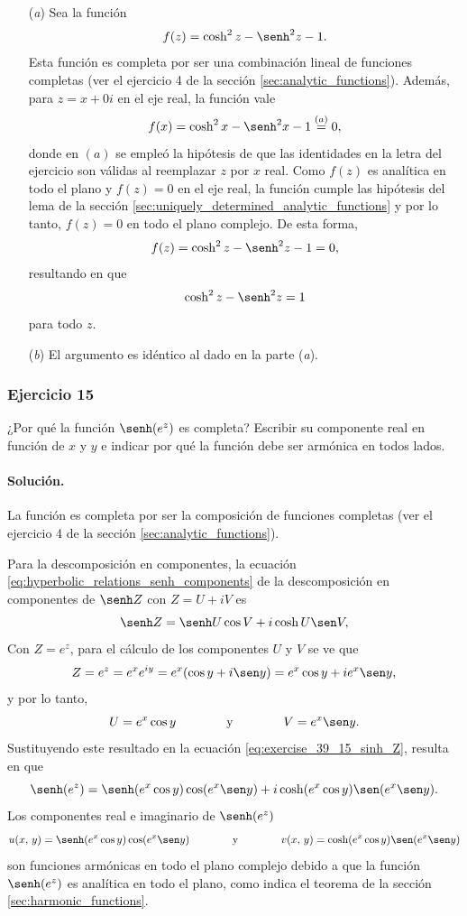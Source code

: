 \documentclass[a4paper]{report}
\begin{document}
\begin{enumerate}
 \item[(\textit{a})] Sea la función 
 \[
  f(z)=\cosh^2z-\senh^2z-1.
 \]
 Esta función es completa por ser una combinación lineal de funciones completas (ver el ejercicio 4 de la sección \ref{sec:analytic_functions}). Además, para \(z=x+0i\) en el eje real, la función vale
 \[
  f(x)=\cosh^2x-\senh^2x-1\overset{(a)}{=}0,
 \]
 donde en \((a)\) se empleó la hipótesis de que las identidades en la letra del ejercicio son válidas al reemplazar \(z\) por \(x\) real. Como \(f(z)\) es analítica en todo el plano y \(f(z)=0\) en el eje real, la función cumple las hipótesis del lema de la sección \ref{sec:uniquely_determined_analytic_functions} y por lo tanto, \(f(z)=0\) en todo el plano complejo. De esta forma,
 \[
  f(z)=\cosh^2z-\senh^2z-1=0,
 \]
 resultando en que 
 \[
  \cosh^2z-\senh^2z=1
 \]
 para todo \(z\).
 \item[(\textit{b})] El argumento es idéntico al dado en la parte (\textit{a}).
\end{enumerate}

\subsubsection{Ejercicio 15}

¿Por qué la función \(\senh(e^z)\) es completa? Escribir su componente real en función de \(x\) y \(y\) e indicar por qué la función debe ser armónica en todos lados.

\paragraph{Solución.} La función es completa por ser la composición de funciones completas (ver el ejercicio 4 de la sección \ref{sec:analytic_functions}).

Para la descomposición en componentes, la ecuación \ref{eq:hyperbolic_relations_senh_components} de la descomposición en componentes de \(\senh Z\) con \(Z=U+iV\) es
\begin{equation}\label{eq:exercise_39_15_sinh_Z}
 \senh Z=\senh U\cos V+i\cosh U\sen V,
\end{equation}
Con \(Z=e^z\), para el cálculo de los componentes \(U\) y \(V\) se ve que 
\[
 Z=e^z=e^xe^{iy}=e^x(\cos y+i\sen y)=e^x\cos y+ie^x\sen y,
\]
y por lo tanto,
\[
 U=e^x\cos y
 \qquad\qquad\textrm{y}\qquad\qquad
 V=e^x\sen y.
\]
Sustituyendo este resultado en la ecuación \ref{eq:exercise_39_15_sinh_Z}, resulta en que 
\[
 \senh(e^z)=\senh(e^x\cos y)\cos(e^x\sen y)+i\cosh(e^x\cos y)\sen(e^x\sen y).
\]
Los componentes real e imaginario de \(\senh(e^z)\)
\[
 u(x,\,y)=\senh(e^x\cos y)\cos(e^x\sen y)
 \qquad\qquad\textrm{y}\qquad\qquad
 v(x,\,y)=\cosh(e^x\cos y)\sen(e^x\sen y)
\]
son funciones armónicas en todo el plano complejo debido a que la función \(\senh(e^z)\) es analítica en todo el plano, como indica el teorema de la sección \ref{sec:harmonic_functions}.
\end{document}
